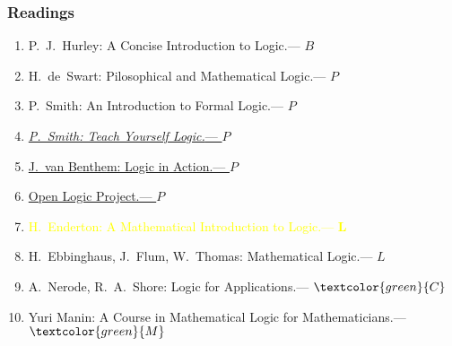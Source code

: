 \documentclass[UTF8,11pt,colorlinks,compress,openany]{beamer}%
\begin{document}
\begin{frame}\frametitle{Readings}
		\begin{enumerate}
			\item P.~J.~Hurley: A Concise Introduction to Logic.\hfill --- $B$
			\item H.~de~Swart: Pilosophical and Mathematical Logic.\hfill --- $P$
			\item P.~Smith: An Introduction to Formal Logic.\hfill --- $P$
			\item \href{http://www.logicmatters.net/tyl}{\emph{P.~Smith: Teach Yourself Logic.}\hfill --- $P$}
			\item \href{http://www.logicinaction.org}{J.~van Benthem: Logic in Action.\hfill --- $P$}
			\item \href{http://builds.openlogicproject.org}{Open Logic Project.\hfill --- $P$}
			\item \textcolor{yellow}{H.~Enderton: A Mathematical Introduction to Logic.\hfill --- $\textbf{L}$}
			\item H.~Ebbinghaus, J.~Flum, W.~Thomas: Mathematical Logic.\hfill --- $L$
			\item A.~Nerode, R.~A.~Shore: Logic for Applications.\hfill --- $\textcolor{green}{C}$
			\item Yuri Manin: A Course in Mathematical Logic for Mathematicians.\hfill --- $\textcolor{green}{M}$
		\end{enumerate}
\end{frame}
\end{document}

